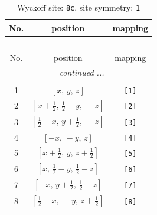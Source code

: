 \documentclass[fleqn,8pt]{jsarticle}
\begin{document}
\renewcommand{\arraystretch}{1.2}
\begin{longtable}{ccc}
\caption{Wyckoff site: {\tt 8c}, site symmetry: {\tt 1}}
 \\
 \hline \hline
No. & position & mapping \\ \hline \endfirsthead

\multicolumn{2}{l}{\tablename\ \thetable{}} \\
 \hline \hline
No. & position & mapping \\ \hline \endhead

 \hline \hline
\multicolumn{2}{r}{\footnotesize\it continued ...} \\ \endfoot

 \hline \hline
\multicolumn{2}{r}{} \\ \endlastfoot

1 & $\left[ x,\, y,\, z \right]$ & {\tt [1]} \\ \hline
2 & $\left[ x + \frac{1}{2},\, \frac{1}{2} - y,\, - z \right]$ & {\tt [2]} \\ \hline
3 & $\left[ \frac{1}{2} - x,\, y + \frac{1}{2},\, - z \right]$ & {\tt [3]} \\ \hline
4 & $\left[ - x,\, - y,\, z \right]$ & {\tt [4]} \\ \hline
5 & $\left[ x + \frac{1}{2},\, y,\, z + \frac{1}{2} \right]$ & {\tt [5]} \\ \hline
6 & $\left[ x,\, \frac{1}{2} - y,\, \frac{1}{2} - z \right]$ & {\tt [6]} \\ \hline
7 & $\left[ - x,\, y + \frac{1}{2},\, \frac{1}{2} - z \right]$ & {\tt [7]} \\ \hline
8 & $\left[ \frac{1}{2} - x,\, - y,\, z + \frac{1}{2} \right]$ & {\tt [8]} \\
\end{longtable}
\end{document}

